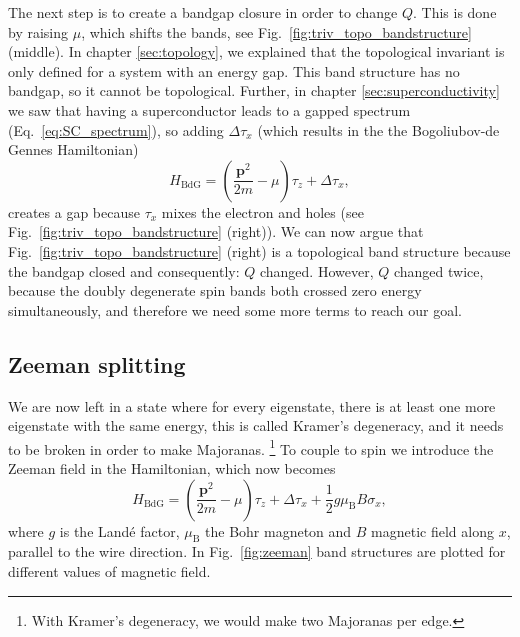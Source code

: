 The next step is to create a bandgap closure in order to change $Q$.
This is done by raising $\mu$, which shifts the bands, see Fig.~\ref{fig:triv_topo_bandstructure} (middle).
In chapter \ref{sec:topology}, we explained that the topological invariant is only defined for a system with an energy gap.
This band structure has no bandgap, so it cannot be topological.
Further, in chapter \ref{sec:superconductivity} we saw that having a superconductor leads to a gapped spectrum (Eq.~\ref{eq:SC_spectrum}), so adding $\Delta\tau_{x}$ (which results in the the Bogoliubov-de Gennes Hamiltonian)
\[
H_{\textrm{BdG}}=\left(\frac{\bm{p}^{2}}{2m}-\mu\right)\tau_{z}+\Delta\tau_{x},
\]
creates a gap because $\tau_{x}$ mixes the electron and holes (see Fig.~\ref{fig:triv_topo_bandstructure} (right)).
We can now argue that Fig.~\ref{fig:triv_topo_bandstructure} (right) is a topological band structure because the bandgap closed and consequently: $Q$ changed.
However, $Q$ changed twice, because the doubly degenerate spin bands both crossed zero energy simultaneously, and therefore we need some more terms to reach our goal.

\subsection{Zeeman splitting}

We are now left in a state where for every eigenstate, there is at least one more eigenstate with the same energy, this is called Kramer's degeneracy, and it needs to be broken in order to make Majoranas.
\footnote{With Kramer's degeneracy, we would make two Majoranas per edge.}
To couple to spin we introduce the Zeeman field in the Hamiltonian, which now becomes
\begin{equation}
H_{\textrm{BdG}}=\left(\frac{\bm{p}^{2}}{2m}-\mu\right)\tau_{z}+\Delta\tau_{x}+\frac{1}{2}g\mu_{\textrm{B}}B\sigma_{x},\label{eq:zeeman}
\end{equation}
where $g$ is the Landé factor, $\mu_{\textrm{B}}$ the Bohr magneton and $B$ magnetic field along $x$, parallel to the wire direction.
In Fig.~\ref{fig:zeeman} band structures are plotted for different values of magnetic field.

